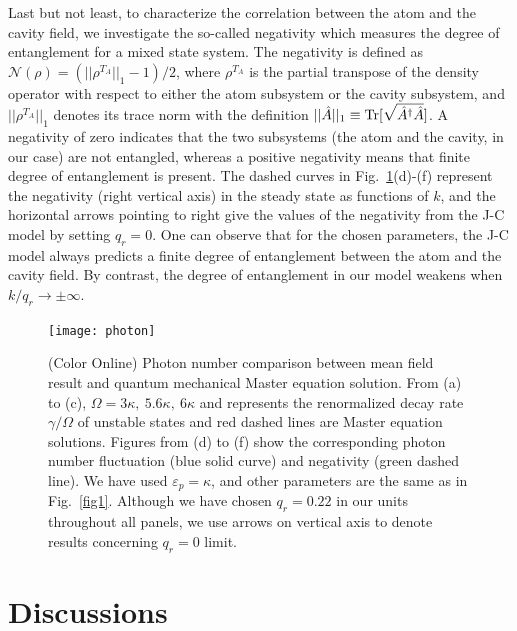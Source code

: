 \documentclass[atoms,article,submit,moreauthors,pdftex,12pt,a4paper]{mdpi}
\begin{document}
Last but not least, to characterize the correlation between the atom and the cavity field, we investigate the so-called negativity \cite{negativity} which measures the degree of entanglement for a mixed state system.
The negativity is defined as $\mathcal{N}(\rho)=(||\rho^{T_A}||_1-1)/2$, where $\rho^{T_A}$ is the partial transpose of the density operator with respect to either the atom subsystem or the cavity subsystem, and $||\rho^{T_A}||_1$ denotes its trace norm with the definition $||\hat{A}||_1 \equiv {\rm Tr}[\sqrt{\hat{A}^\dag \hat{A}} ]$. A negativity of zero indicates that the two subsystems (the atom and the cavity, in our case) are not entangled, whereas a positive negativity means that finite degree of entanglement is present. The dashed curves in Fig.~\ref{photon}(d)-(f) represent the negativity (right vertical axis) in the steady state as functions of $k$, and the horizontal arrows pointing to right give the values of the negativity from the J-C model by setting $q_r=0$. One can observe that for the chosen parameters, the J-C model always predicts a finite degree of entanglement between the atom and the cavity field. By contrast, the degree of entanglement in our model weakens when $k/q_r \longrightarrow \pm \infty$.

\begin{figure}[htp]
\texttt{[image: photon]}
\caption{ (Color Online) Photon number comparison between mean field result and quantum mechanical Master equation solution. From (a) to (c), $\Omega = 3\kappa,\ 5.6\kappa,\ 6\kappa$ and  represents the renormalized decay rate $\gamma/\Omega$ of unstable states and red dashed lines are Master equation solutions. Figures from (d) to (f) show the corresponding photon number fluctuation (blue solid curve) and negativity (green dashed line). We have used $\varepsilon_p=\kappa$, and other parameters are the same as in Fig.~\ref{fig1}. Although we have chosen $q_r=0.22$ in our units throughout all panels, we use arrows on vertical axis to denote results concerning $q_r=0$ limit. 
}\label{photon}
\end{figure}

\section{Discussions} \label{relation}
\end{document}

